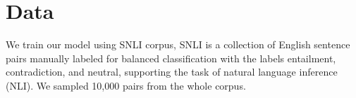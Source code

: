 \section{Data}

We train our model using SNLI corpus, SNLI is a collection of English sentence pairs manually labeled for balanced classification with the labels entailment, contradiction, and neutral, supporting the task of natural language inference (NLI). We sampled 10,000 pairs from the whole corpus.